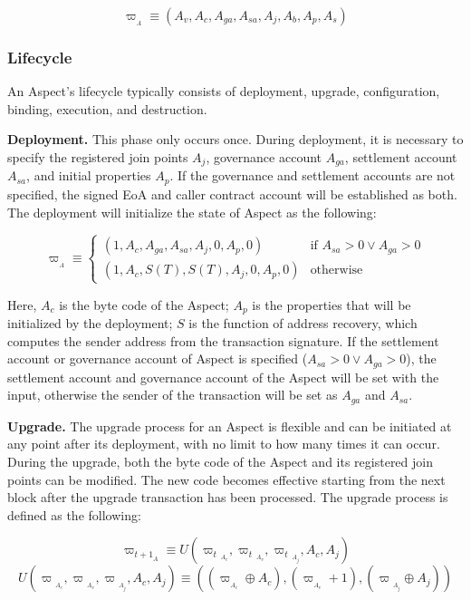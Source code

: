 \[
\varpi_{_A} \equiv (A_{v},A_{c},A_{ga},A_{sa},A_{j}, A_{b},A_{p},A_{s})
\]

\subsubsection{Lifecycle}

An Aspect's lifecycle typically consists of deployment, upgrade, configuration, binding, execution, and destruction.

\textbf{Deployment.} This phase only occurs once. During deployment, it is necessary to specify the registered join points $A_{j}$, governance account $A_{ga}$, settlement account $A_{sa}$, and initial properties $A_{p}$. If the governance and settlement accounts are not specified, the signed EoA and caller contract account will be established as both. The deployment will initialize the state of Aspect as the following:

\[
\varpi_{_A} \equiv
\begin{cases}
    (1,A_c,A_{ga},A_{sa},A_{j},0,A_{p},0) & \text{if } A_{sa} > 0 \lor A_{ga} > 0 \\
    (1,A_c,S(T),S(T),A_{j},0,A_{p},0) & \text{otherwise}
\end{cases}
\]

Here, $A_{c}$ is the byte code of the Aspect; $A_{p}$ is the properties that will be initialized by the deployment; $S$ is the function of address recovery, which computes the sender address from the transaction signature. If the settlement account or governance account of Aspect is specified ($A_{sa} > 0 \lor A_{ga} > 0$), the settlement account and governance account of the Aspect will be set with the input, otherwise the sender of the transaction will be set as $A_{ga}$ and $A_{sa}$.

\textbf{Upgrade.} The upgrade process for an Aspect is flexible and can be initiated at any point after its deployment, with no limit to how many times it can occur. During the upgrade, both the byte code of the Aspect and its registered join points can be modified. The new code becomes effective starting from the next block after the upgrade transaction has been processed. The upgrade process is defined as the following:

\[
\varpi_{{t+1}_A} \equiv U(\varpi_t{_{_{A_c}}},\varpi_t{_{_{A_v}}},\varpi_t{_{_{A_j}}},A_c,A_j)
\]
\[
U(\varpi{_{_{A_c}}},\varpi{_{_{A_v}}},\varpi{_{_{A_j}}},A_c,A_j) \equiv ((\varpi_{_{A_c}} \oplus A_{c}),(\varpi_{_{A_v}} + 1),(\varpi{_{_{A_j}}} \oplus A_j)) 
\]

